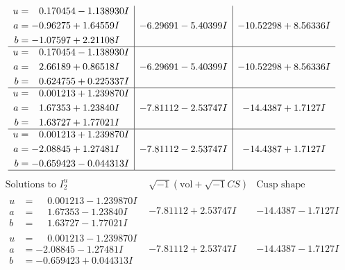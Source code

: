 \documentclass[1p]{elsarticle_modified}
\theoremstyle{definition}
\newcommand{\I}{\sqrt{-1}}
\begin{document}
$$\begin{array}{c|c|c}
\begin{aligned}
u &= \phantom{-}0.170454 - 1.138930 I \\
a &= -0.96275 + 1.64559 I \\
b &= -1.07597 + 2.21108 I\end{aligned}
 & -6.29691 - 5.40399 I & -10.52298 + 8.56336 I \\ \hline\begin{aligned}
u &= \phantom{-}0.170454 - 1.138930 I \\
a &= \phantom{-}2.66189 + 0.86518 I \\
b &= \phantom{-}0.624755 + 0.225337 I\end{aligned}
 & -6.29691 - 5.40399 I & -10.52298 + 8.56336 I \\ \hline\begin{aligned}
u &= \phantom{-}0.001213 + 1.239870 I \\
a &= \phantom{-}1.67353 + 1.23840 I \\
b &= \phantom{-}1.63727 + 1.77021 I\end{aligned}
 & -7.81112 - 2.53747 I & -14.4387 + 1.7127 I \\ \hline\begin{aligned}
u &= \phantom{-}0.001213 + 1.239870 I \\
a &= -2.08845 + 1.27481 I \\
b &= -0.659423 - 0.044313 I\end{aligned}
 & -7.81112 - 2.53747 I & -14.4387 + 1.7127 I\\
 \hline 
 \end{array}$$\newpage$$\begin{array}{c|c|c}  
\text{Solutions to }I^u_{2}& \I (\text{vol} + \sqrt{-1}CS) & \text{Cusp shape}\\
 \hline 
\begin{aligned}
u &= \phantom{-}0.001213 - 1.239870 I \\
a &= \phantom{-}1.67353 - 1.23840 I \\
b &= \phantom{-}1.63727 - 1.77021 I\end{aligned}
 & -7.81112 + 2.53747 I & -14.4387 - 1.7127 I \\ \hline\begin{aligned}
u &= \phantom{-}0.001213 - 1.239870 I \\
a &= -2.08845 - 1.27481 I \\
b &= -0.659423 + 0.044313 I\end{aligned}
 & -7.81112 + 2.53747 I & -14.4387 - 1.7127 I \\ \hline\begin{aligned}

\end{aligned}
\end{array}$$
\end{document}
